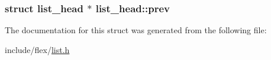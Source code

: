 \subsubsection[{\texorpdfstring{prev}{prev}}]{\setlength{\rightskip}{0pt plus 5cm}struct {\bf list\+\_\+head} $\ast$ list\+\_\+head\+::prev}\hypertarget{structlist__head_aaa0eabda8877e1d6de73a33f223ad004}{}\label{structlist__head_aaa0eabda8877e1d6de73a33f223ad004}


The documentation for this struct was generated from the following file\+:\begin{DoxyCompactItemize}
\item 
include/flex/\hyperlink{include_2flex_2list_8h}{list.\+h}\end{DoxyCompactItemize}
